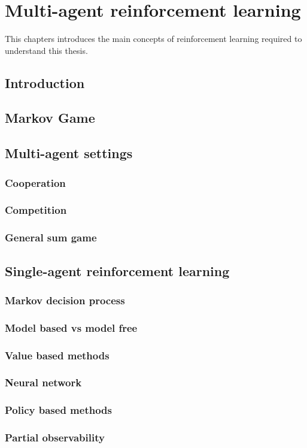 \chapter{Multi-agent reinforcement learning}\label{ch:marl}

\begin{chapter_outline}

This chapters introduces the main concepts of reinforcement learning required to understand this thesis.

\end{chapter_outline}
\section{Introduction}
\section{Markov Game}
\section{Multi-agent settings}
\subsection{Cooperation}
\subsection{Competition}
\subsection{General sum game}
\section{Single-agent reinforcement learning}
\subsection{Markov decision process}
\subsection{Model based vs model free}
\subsection{Value based methods}
\subsection{Neural network}
\subsection{Policy based methods}
\subsection{Partial observability}